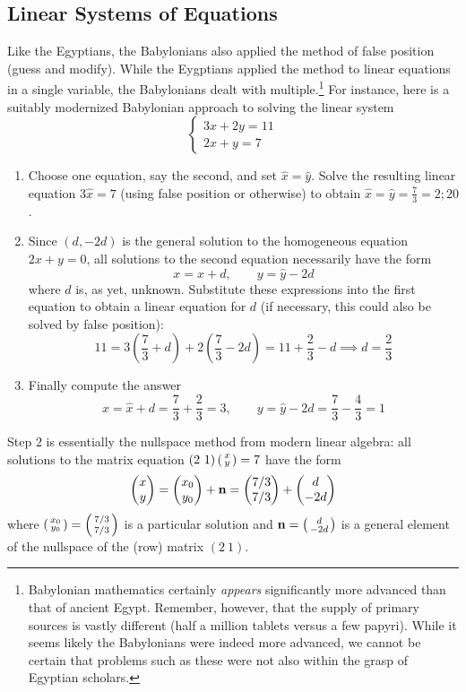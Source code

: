 \pagebreak[3]


\subsection*{Linear Systems of Equations}

Like the Egyptians, the Babylonians also applied the method of false position (guess and modify). While the Eygptians applied the method to linear equations in a single variable, the Babylonians dealt with multiple.\footnote{%
	Babylonian mathematics certainly \emph{appears} significantly more advanced than that of ancient Egypt. Remember, however, that the supply of primary sources is vastly different (half a million tablets versus a few papyri). While it seems likely the Babylonians were indeed more advanced, we cannot be certain that problems such as these were not also within the grasp of Egyptian scholars.
}
For instance, here is a suitably modernized Babylonian approach to solving the linear system
\[
	\begin{cases}
		3x+2y=11\\
		2x+y=7
	\end{cases}
\]
\begin{enumerate}
  \item Choose one equation, say the second, and set $\hat x=\hat y$. Solve the resulting linear equation $3\hat x=7$ (using false position or otherwise) to obtain $\hat x=\hat y=\frac 73=2;20$.
  \item Since $(d,-2d)$ is the general solution to the homogeneous equation $2x+y=0$, all solutions to the second equation necessarily have the form
  \[
  	x=\hat x+d,\qquad y=\hat y-2d
 	\]
 	where $d$ is, as yet, unknown. Substitute these expressions into the first equation to obtain a linear equation for $d$ (if necessary, this could also be solved by false position):
  \[
  	11=3\left(\frac 73+d\right)+2\left(\frac 73-2d\right)=11+\frac 23-d\implies d=\frac 23
  \]
  \item Finally compute the answer
  \[
  	x=\hat x+d=\frac 73+\frac 23=3,\qquad
  	y=\hat y-2d=\frac 73-\frac 43=1
  \]
\end{enumerate}
Step 2 is essentially the nullspace method from modern linear algebra: all solutions to the matrix equation $(2\ 1)\left(\begin{smallmatrix}x\\y\end{smallmatrix}\right)=7$ have the form
\[
	\begin{pmatrix}x\\y\end{pmatrix}=\begin{pmatrix}x_0\\y_0\end{pmatrix}+{\mathbf{n}} =\begin{pmatrix}7/3\\7/3\end{pmatrix}+\begin{pmatrix}d\\-2d\end{pmatrix}
\]
where $\left(\begin{smallmatrix}x_0\\y_0\end{smallmatrix}\right)=\left(\begin{smallmatrix}7/3\\7/3\end{smallmatrix}\right)$ is a particular solution and ${\mathbf{n}}=\left(\begin{smallmatrix}d\\-2d\end{smallmatrix}\right)$ is a general element of the nullspace of the (row) matrix $(2\ 1)$.


